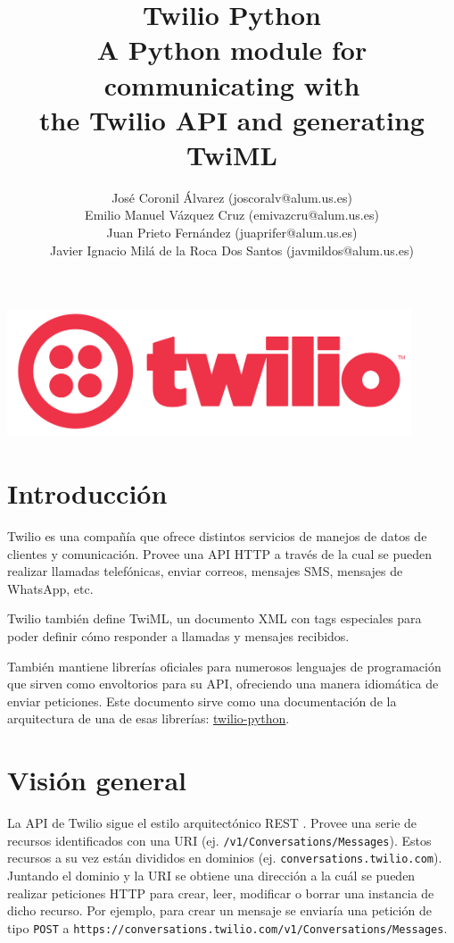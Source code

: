 \documentclass{article}
\title{%
  Twilio Python \\
  \large A Python module for communicating with \\
  the Twilio API and generating TwiML}
\author{José Coronil Álvarez (joscoralv@alum.us.es) \\
Emilio Manuel Vázquez Cruz (emivazcru@alum.us.es) \\
Juan Prieto Fernández (juaprifer@alum.us.es) \\
Javier Ignacio Milá de la Roca Dos Santos (javmildos@alum.us.es) \\}
\date{}
\begin{document}
\begin{titlepage}
  \centering
  \vfil
  {\bfseries\Large
      \thetitle
  }    
  \vfill
  \includegraphics[width=12cm]{logo.png} %
  \vfill
  \theauthor
\end{titlepage}

\tableofcontents

\newpage

\section{Introducción}

Twilio es una compañía que ofrece distintos servicios
de manejos de datos de clientes y comunicación.
Provee una API HTTP a través de la cual se pueden realizar llamadas telefónicas,
enviar correos, mensajes SMS, mensajes de WhatsApp, etc.

Twilio también define TwiML,
un documento XML con tags especiales
para poder definir cómo responder a llamadas y mensajes recibidos.

También mantiene librerías oficiales para numerosos lenguajes de programación
que sirven como envoltorios para su API,
ofreciendo una manera idiomática de enviar peticiones.
Este documento sirve como una documentación de la arquitectura
de una de esas librerías:
\href{https://github.com/twilio/twilio-python}{twilio-python}.

\section{Visión general}

La API de Twilio sigue el estilo arquitectónico REST \cite{twilio-rest}.
Provee una serie de recursos identificados con una URI
(ej. \verb|/v1/Conversations/Messages|).
Estos recursos a su vez están divididos en dominios
(ej. \verb|conversations.twilio.com|).
Juntando el dominio y la URI se obtiene una dirección
a la cuál se pueden realizar peticiones HTTP
para crear, leer, modificar o borrar una instancia de dicho recurso.
Por ejemplo, para crear un mensaje se enviaría una petición
de tipo \verb|POST|
a \verb|https://conversations.twilio.com/v1/Conversations/Messages|.
\end{document}
